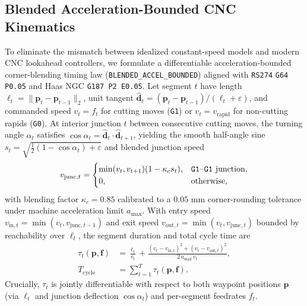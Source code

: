 \documentclass[conference]{IEEEtran}
\begin{document}
\subsection{Blended Acceleration-Bounded CNC Kinematics}
To eliminate the mismatch between idealized constant-speed models and modern CNC lookahead controllers, we formulate a differentiable acceleration-bounded corner-blending timing law (\texttt{BLENDED\_ACCEL\_BOUNDED}) aligned with \texttt{RS274} \texttt{G64 P0.05} and Haas NGC \texttt{G187 P2 E0.05}. Let segment $t$ have length $\ell_t = \|\mathbf{p}_t - \mathbf{p}_{t-1}\|_2$, unit tangent $\hat{\mathbf{d}}_t = (\mathbf{p}_t - \mathbf{p}_{t-1}) / (\ell_t + \varepsilon)$, and commanded speed $v_t = f_t$ for cutting moves (\texttt{G1}) or $v_t = v_{\text{rapid}}$ for non-cutting rapids (\texttt{G0}). At interior junction $t$ between consecutive cutting moves, the turning angle $\alpha_t$ satisfies $\cos\alpha_t = \hat{\mathbf{d}}_t \cdot \hat{\mathbf{d}}_{t+1}$, yielding the smooth half-angle sine $s_t = \sqrt{\tfrac{1}{2}(1 - \cos\alpha_t) + \varepsilon}$ and blended junction speed
\begin{equation}
  v_{\text{junc},t} = \begin{cases}
    \min(v_t, v_{t+1})(1 - \kappa_c s_t), & \text{\texttt{G1}--\texttt{G1} junction}, \\
    0, & \text{otherwise},
  \end{cases}
  \label{eq:junc_speed}
\end{equation}
with blending factor $\kappa_c = 0.85$ calibrated to a $0.05\text{ mm}$ corner-rounding tolerance under machine acceleration limit $a_{\max}$. With entry speed $v_{\text{in},t} = \min(v_t, v_{\text{junc},t-1})$ and exit speed $v_{\text{out},t} = \min(v_t, v_{\text{junc},t})$ bounded by reachability over $\ell_t$, the segment duration and total cycle time are
\begin{equation}
  \begin{aligned}
    \tau_t(\mathbf{p}, \mathbf{f}) &= \frac{\ell_t}{v_t} + \frac{(v_t - v_{\text{in},t})^2 + (v_t - v_{\text{out},t})^2}{2\,a_{\max}\,v_t}, \\
    T_{\text{cycle}} &= \sum_{t=1}^T \tau_t(\mathbf{p}, \mathbf{f}).
  \end{aligned}
  \label{eq:cycle_time}
\end{equation}
Crucially, $\tau_t$ is jointly differentiable with respect to both waypoint positions $\mathbf{p}$ (via $\ell_t$ and junction deflection $\cos\alpha_t$) and per-segment feedrates $f_t$.
\end{document}
